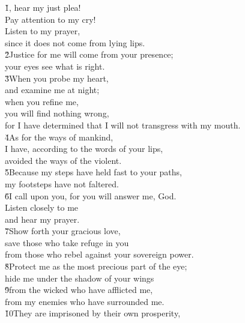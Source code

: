 \begin{poetry}
\poeml \v{1}, hear my just plea! \\
\poemll    Pay attention to my cry! \\
\poeml Listen to my prayer, \\
\poemll    since it does not come from lying lips. \\
\poeml \v{2}Justice for me will come from your presence; \\
\poemll    your eyes see what is right. \\
\poeml \v{3}When you probe my heart, \\
\poemll    and examine me at night; \\
\poeml when you refine me, \\
\poemll    you will find nothing wrong, \\
\poemlll       for I have determined that I will not transgress with my mouth. \\
\poeml \v{4}As for the ways of mankind, \\
\poemll    I have, according to the words of your lips, \\
\poemlll       avoided the ways of the violent. \\
\poeml \v{5}Because my steps have held fast to your paths, \\
\poemll    my footsteps have not faltered. \\
\poeml \v{6}I call upon you, for you will answer me, God. \\
\poemll    Listen closely to me \\
\poemlll       and hear my prayer. \\
\poeml \v{7}Show forth your gracious love, \\
\poemll    save those who take refuge in you \\
\poemlll       from those who rebel against your sovereign power. \\
\poeml \v{8}Protect me as the most precious part of the eye; \\
\poemll    hide me under the shadow of your wings \\
\poeml \v{9}from the wicked who have afflicted me, \\
\poemll    from my enemies who have surrounded me. \\
\poeml \v{10}They are imprisoned by their own prosperity, \\

\end{poetry}
